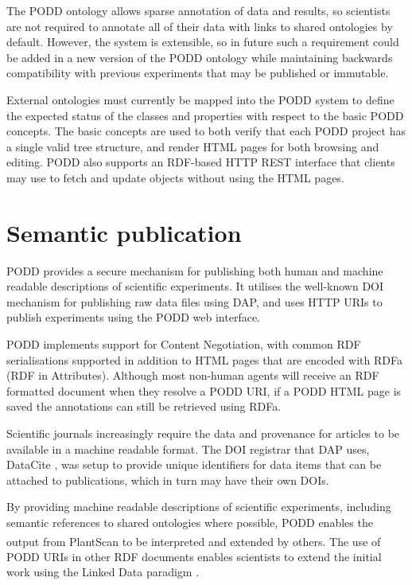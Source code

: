\documentclass{llncs}
\begin{document}
The PODD ontology allows sparse annotation of data and results, so scientists
are not required to annotate all of their data with links to shared ontologies
by default. However, the system is extensible, so in future such a requirement
could be added in a new version of the PODD ontology while maintaining backwards
compatibility with previous experiments that may be published or immutable.


External ontologies must currently be mapped into the PODD system to define the
expected status of the classes and properties with respect to the basic PODD
concepts. The basic concepts are used to both verify that each PODD project has
a single valid tree structure, and render HTML pages for both browsing and
editing. PODD also supports an RDF-based HTTP REST interface that clients may
use to fetch and update objects without using the HTML pages.


\section{Semantic publication}
PODD provides a secure mechanism for publishing both human and machine readable
descriptions of scientific experiments. It utilises the well-known DOI mechanism
for publishing raw data files using DAP, and uses HTTP URIs to publish
experiments using the PODD web interface.


PODD implements support for Content Negotiation, with common RDF serialisations
supported in addition to HTML pages that are encoded with RDFa (RDF in
Attributes). Although most non-human agents will receive an RDF formatted
document when they resolve a PODD URI, if a PODD HTML page is saved the
annotations can still be retrieved using RDFa. 


Scientific journals increasingly require the data and provenance for articles to
be available in a machine readable format. The DOI registrar that DAP uses,
DataCite \cite{Brase2009}, was setup to provide unique identifiers for data items that can
be attached to publications, which in turn may have their own DOIs.


By providing machine readable descriptions of scientific experiments, including
semantic references to shared ontologies where possible, PODD enables the output
from PlantScan\textsuperscript{\texttrademark} to be interpreted and extended by others. The use of PODD URIs
in other RDF documents enables scientists to extend the initial work using the
Linked Data paradigm \cite{BernersLee}.
\end{document}
